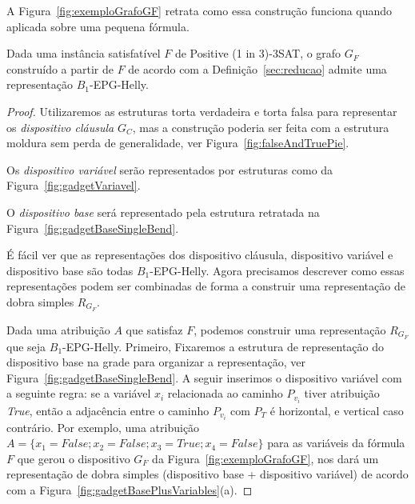 A Figura~\ref{fig:exemploGrafoGF} retrata como essa construção funciona quando aplicada sobre uma pequena fórmula. %





\begin{lema}\label{lem:ida}
Dada uma instância satisfatível $F$ de {\sc Positive (1 in 3)-3SAT}, o grafo  $G_F$ construído a partir de $F$ de acordo com a Definição~\ref{sec:reducao} admite uma representação $B_{1}$-EPG-Helly.
\end{lema}


\begin{proof}

Utilizaremos as estruturas  torta verdadeira e torta falsa para representar os  \textit{dispositivo cláusula} $ G_C$, mas a construção poderia ser feita com a estrutura moldura sem perda de generalidade, ver Figura~\ref{fig:falseAndTruePie}.  




Os \textit{dispositivo variável} serão representados por estruturas como da Figura~\ref{fig:gadgetVariavel}.




O \textit{dispositivo base} será representado pela estrutura retratada na  Figura~\ref{fig:gadgetBaseSingleBend}.



É fácil ver que as representações dos dispositivo cláusula, dispositivo variável e dispositivo base são todas  $B_1$-EPG-Helly. Agora precisamos descrever como essas representações podem ser combinadas de forma a construir uma representação  de dobra simples $R_{G_F}$.

Dada uma atribuição  $A$ que satisfaz  $F$, podemos construir uma representação $R_{G_F}$ que seja  $B_{1}$-EPG-Helly. Primeiro, Fixaremos a estrutura de representação do dispositivo base na grade para organizar a representação, ver Figura~\ref{fig:gadgetBaseSingleBend}. A seguir inserimos o  dispositivo variável com a seguinte regra: se a variável $x_i$ relacionada ao caminho   $P_{v_i}$ tiver atribuição  \textit{True}, então a adjacência entre o caminho $P_{v_i}$ com $P_{T}$ é horizontal, e vertical caso contrário. Por exemplo, uma atribuição  $A=\{x_1=False; x_2=False;x_3=True; x_4=False\}$  para as variáveis da fórmula  $F$ que gerou o dispositivo $G_F$ da Figura~\ref{fig:exemploGrafoGF}, nos dará um representação de dobra simples (dispositivo base + dispositivo variável) de acordo com a  Figura~\ref{fig:gadgetBasePlusVariables}(a). 


\end{proof}
